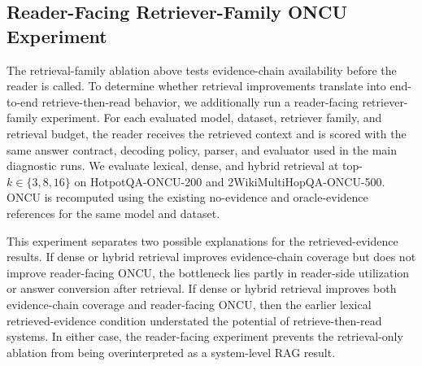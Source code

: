 \subsection{Reader-Facing Retriever-Family ONCU Experiment}
\label{subsec:reader_facing_retriever_family}

The retrieval-family ablation above tests evidence-chain availability before the reader is called. To determine whether retrieval improvements translate into end-to-end retrieve-then-read behavior, we additionally run a reader-facing retriever-family experiment. For each evaluated model, dataset, retriever family, and retrieval budget, the reader receives the retrieved context and is scored with the same answer contract, decoding policy, parser, and evaluator used in the main diagnostic runs. We evaluate lexical, dense, and hybrid retrieval at top-$k \in \{3,8,16\}$ on HotpotQA-ONCU-200 and 2WikiMultiHopQA-ONCU-500. ONCU is recomputed using the existing no-evidence and oracle-evidence references for the same model and dataset.



This experiment separates two possible explanations for the retrieved-evidence results. If dense or hybrid retrieval improves evidence-chain coverage but does not improve reader-facing ONCU, the bottleneck lies partly in reader-side utilization or answer conversion after retrieval. If dense or hybrid retrieval improves both evidence-chain coverage and reader-facing ONCU, then the earlier lexical retrieved-evidence condition understated the potential of retrieve-then-read systems. In either case, the reader-facing experiment prevents the retrieval-only ablation from being overinterpreted as a system-level RAG result.
